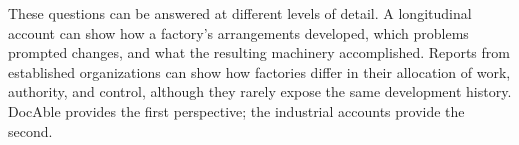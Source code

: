 
These questions can be answered at different levels of detail. A longitudinal account can show how a factory's arrangements developed, which problems prompted changes, and what the resulting machinery accomplished. Reports from established organizations can show how factories differ in their allocation of work, authority, and control, although they rarely expose the same development history. DocAble provides the first perspective; the industrial accounts provide the second.

